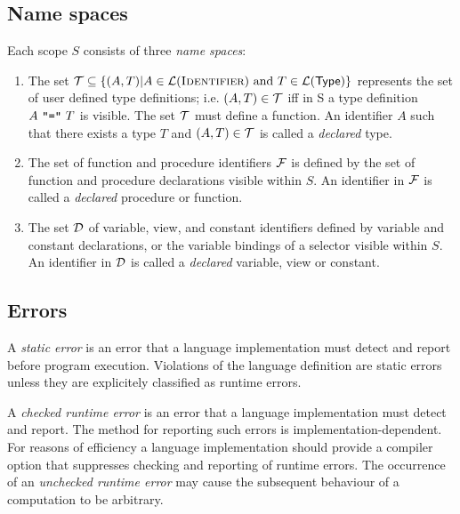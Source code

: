 \subsection*{Name spaces}

Each scope $S$ consists of three {\em name spaces}:

\begin{enumerate}

\item The set $\mbox{$\cal T$} \subseteq \{(A, T) | A \in
\mbox{$\cal L$}(\mbox{\sc {Identifier}}) \mbox{ and } T \in \mbox{$\cal L$}(\mbox{\sf {Type}})\}$
represents the set of user defined type definitions; i.e. $(A,T) \in
\mbox{$\cal T$}$ iff in S a type definition $A\ \mbox{\tt "{=}"}\ T$ is visible. The
set $\mbox{$\cal T$}$ must define a function. An identifier $A$ such that
there exists a type $T$ and $(A, T) \in {\cal T}$ is called a {\em
declared} type.

\item The set of function and procedure identifiers ${\cal F}$ is
defined by the set of function and procedure declarations visible
within $S$.  An identifier in ${\cal F}$ is called a {\em declared}
procedure or function.

\item The set ${\cal D}$ of variable, view, and constant identifiers
defined by variable and constant declarations, or the variable
bindings of a selector visible within $S$. An identifier in ${\cal D}$
is called a {\em declared} variable, view or constant.

\end{enumerate}

\subsection*{Errors}

A {\em static error} is an error that a language implementation must
detect and report before program execution. Violations of the language
definition are static errors unless they are explicitely classified as
runtime errors.

A {\em checked runtime error} is an error that a language
implementation must detect and report. The method for reporting such
errors is implementation-dependent. For reasons of efficiency a
language implementation should provide a compiler option that
suppresses checking and reporting of runtime errors. The occurrence of
an {\em unchecked runtime error} may cause the subsequent behaviour of
a computation to be arbitrary.

